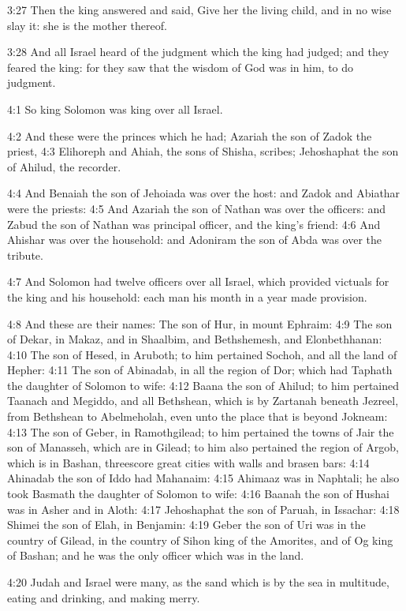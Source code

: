 3:27 Then the king answered and said, Give her the living child, and in no wise slay it: she is the mother thereof.

3:28 And all Israel heard of the judgment which the king had judged; and they feared the king: for they saw that the wisdom of God was in him, to do judgment.

4:1 So king Solomon was king over all Israel.

4:2 And these were the princes which he had; Azariah the son of Zadok the priest, 4:3 Elihoreph and Ahiah, the sons of Shisha, scribes; Jehoshaphat the son of Ahilud, the recorder.

4:4 And Benaiah the son of Jehoiada was over the host: and Zadok and Abiathar were the priests: 4:5 And Azariah the son of Nathan was over the officers: and Zabud the son of Nathan was principal officer, and the king's friend: 4:6 And Ahishar was over the household: and Adoniram the son of Abda was over the tribute.

4:7 And Solomon had twelve officers over all Israel, which provided victuals for the king and his household: each man his month in a year made provision.

4:8 And these are their names: The son of Hur, in mount Ephraim: 4:9 The son of Dekar, in Makaz, and in Shaalbim, and Bethshemesh, and Elonbethhanan: 4:10 The son of Hesed, in Aruboth; to him pertained Sochoh, and all the land of Hepher: 4:11 The son of Abinadab, in all the region of Dor; which had Taphath the daughter of Solomon to wife: 4:12 Baana the son of Ahilud; to him pertained Taanach and Megiddo, and all Bethshean, which is by Zartanah beneath Jezreel, from Bethshean to Abelmeholah, even unto the place that is beyond Jokneam: 4:13 The son of Geber, in Ramothgilead; to him pertained the towns of Jair the son of Manasseh, which are in Gilead; to him also pertained the region of Argob, which is in Bashan, threescore great cities with walls and brasen bars: 4:14 Ahinadab the son of Iddo had Mahanaim: 4:15 Ahimaaz was in Naphtali; he also took Basmath the daughter of Solomon to wife: 4:16 Baanah the son of Hushai was in Asher and in Aloth: 4:17 Jehoshaphat the son of Paruah, in Issachar: 4:18 Shimei the son of Elah, in Benjamin: 4:19 Geber the son of Uri was in the country of Gilead, in the country of Sihon king of the Amorites, and of Og king of Bashan; and he was the only officer which was in the land.

4:20 Judah and Israel were many, as the sand which is by the sea in multitude, eating and drinking, and making merry.

